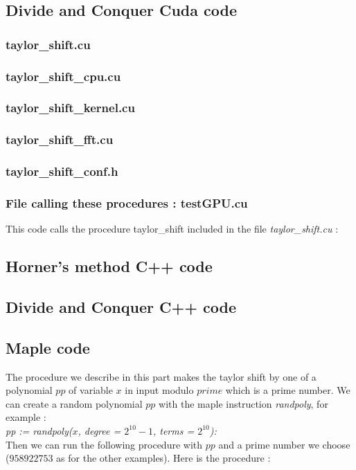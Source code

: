 \subsection{Divide and Conquer Cuda code}
\subsubsection{taylor\_shift.cu}


\subsubsection{taylor\_shift\_cpu.cu}


\subsubsection{taylor\_shift\_kernel.cu}


\subsubsection{taylor\_shift\_fft.cu}


\subsubsection{taylor\_shift\_conf.h}


\subsubsection{File calling these procedures : testGPU.cu}
This code calls the procedure taylor\_shift included in the file \textit{taylor\_shift.cu} :


\subsection{Horner's method C++ code}


\subsection{Divide and Conquer C++ code}


\subsection{Maple code}
The procedure we describe in this part makes the taylor shift by one of a polynomial $pp$ of variable $x$ in input modulo $prime$ which is a prime number. We can create a random polynomial $pp$ with the maple instruction \textit{randpoly}, for example :\\
\textit{pp := randpoly($x$, degree = $2^{10} - 1$, terms = $2^{10}$):}\\

Then we can run the following procedure with $pp$ and a prime number we choose ($958922753$ as for the other examples). Here is the procedure : \\



